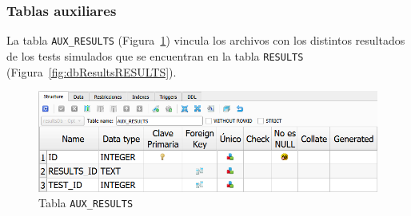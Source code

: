 \subsubsection{Tablas auxiliares}

La tabla \texttt{AUX\_RESULTS} (Figura~\ref{fig:dbResultsAUX_RESULTS}) vincula los archivos con los distintos resultados de los tests simulados que se encuentran en la tabla \texttt{RESULTS} (Figura~\ref{fig:dbResultsRESULTS}). 

\begin{figure}[H]
\centering
\includegraphics[width=.9\textwidth]{fig/Tablas base de datos/Resultados/AUX_RESULTS.png}
\caption{Tabla \texttt{AUX\_RESULTS}}
\label{fig:dbResultsAUX_RESULTS}
\end{figure}